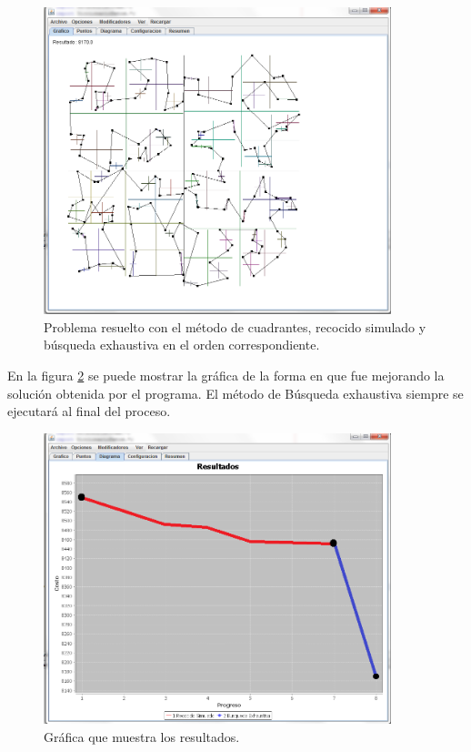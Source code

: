     \begin{figure}[hbtp]
        \centering
            \includegraphics[width=0.9\textwidth]{Software/Imagenes/Software_Uso_6.png}
            \caption{Problema resuelto con el método de cuadrantes, recocido simulado y búsqueda exhaustiva en el orden correspondiente.}
            \label{fig:Software_Uso_6}
    \end{figure}
\clearpage \newpage

\hspace*{1cm}En la figura \ref {fig:Software_Uso_7} se puede mostrar la gráfica de la forma en que fue mejorando la solución obtenida por el programa. El método de Búsqueda exhaustiva siempre se ejecutará al final del proceso.\\

    \begin{figure}[hbtp]
        \centering
            \includegraphics[width=0.9\textwidth]{Software/Imagenes/Software_Uso_7.png}
            \caption{Gráfica que muestra los resultados.}
            \label{fig:Software_Uso_7}
    \end{figure}
\clearpage \newpage

